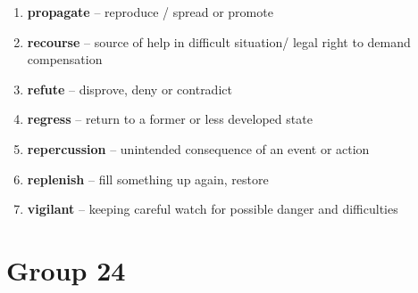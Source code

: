 \begin{enumerate}[wide,labelindent=0pt]
\item \textbf{propagate} -- reproduce / spread or promote
\item \textbf{recourse} -- source of help in difficult situation/ legal right to demand compensation
\item \textbf{refute} -- disprove, deny or contradict
\item \textbf{regress} -- return to a former or less developed state
\item \textbf{repercussion} -- unintended consequence of an event or action
\item \textbf{replenish} -- fill something up again, restore
\item \textbf{vigilant} -- keeping careful watch for possible danger and difficulties
\end{enumerate}

\newpage
\section{Group 24}

